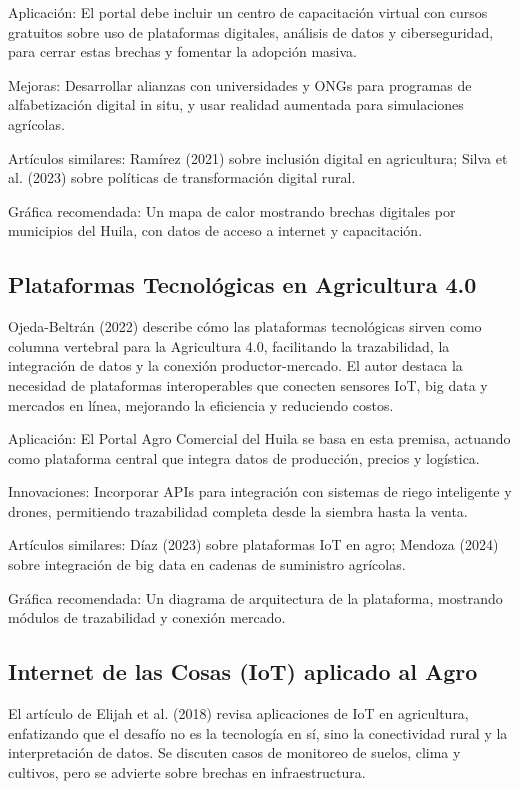 Aplicación: El portal debe incluir un centro de capacitación virtual con cursos gratuitos sobre uso de plataformas digitales, análisis de datos y ciberseguridad, para cerrar estas brechas y fomentar la adopción masiva.

Mejoras: Desarrollar alianzas con universidades y ONGs para programas de alfabetización digital in situ, y usar realidad aumentada para simulaciones agrícolas.

Artículos similares: Ramírez (2021) sobre inclusión digital en agricultura; Silva et al. (2023) sobre políticas de transformación digital rural.

Gráfica recomendada: Un mapa de calor mostrando brechas digitales por municipios del Huila, con datos de acceso a internet y capacitación.

\subsection{Plataformas Tecnológicas en Agricultura 4.0}

Ojeda-Beltrán (2022) describe cómo las plataformas tecnológicas sirven como columna vertebral para la Agricultura 4.0, facilitando la trazabilidad, la integración de datos y la conexión productor-mercado. El autor destaca la necesidad de plataformas interoperables que conecten sensores IoT, big data y mercados en línea, mejorando la eficiencia y reduciendo costos.

Aplicación: El Portal Agro Comercial del Huila se basa en esta premisa, actuando como plataforma central que integra datos de producción, precios y logística.

Innovaciones: Incorporar APIs para integración con sistemas de riego inteligente y drones, permitiendo trazabilidad completa desde la siembra hasta la venta.

Artículos similares: Díaz (2023) sobre plataformas IoT en agro; Mendoza (2024) sobre integración de big data en cadenas de suministro agrícolas.

Gráfica recomendada: Un diagrama de arquitectura de la plataforma, mostrando módulos de trazabilidad y conexión mercado.

\subsection{Internet de las Cosas (IoT) aplicado al Agro}

El artículo de Elijah et al. (2018) revisa aplicaciones de IoT en agricultura, enfatizando que el desafío no es la tecnología en sí, sino la conectividad rural y la interpretación de datos. Se discuten casos de monitoreo de suelos, clima y cultivos, pero se advierte sobre brechas en infraestructura.

